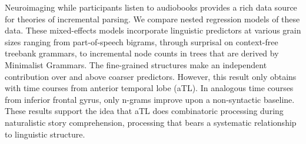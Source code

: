 Neuroimaging while participants listen to audiobooks provides a rich data source for theories of incremental parsing. We compare nested regression models of these data. These mixed-effects models incorporate linguistic predictors at various grain sizes ranging from part-of-speech bigrams, through surprisal on context-free treebank grammars, to incremental node counts in trees that are derived by Minimalist Grammars. The fine-grained structures make an independent contribution over and above coarser predictors. However, this result only obtains with time courses from anterior temporal lobe (aTL). In analogous time courses from inferior frontal gyrus, only n-grams improve upon a non-syntactic baseline. These results support the idea that aTL does combinatoric processing during naturalistic story comprehension, processing that bears a systematic relationship to linguistic structure.
